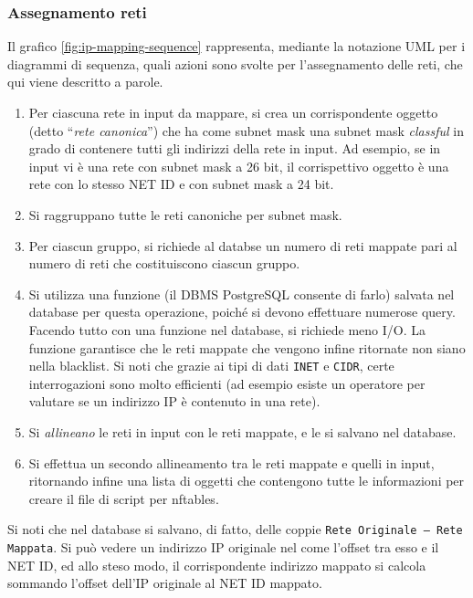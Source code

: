 \subsubsection{Assegnamento reti}
Il grafico \ref{fig:ip-mapping-sequence} rappresenta, mediante la notazione UML per
i diagrammi di sequenza, quali azioni sono svolte per l'assegnamento delle reti, che
qui viene descritto a parole.
\begin{enumerate}
	\item Per ciascuna rete in input da mappare, si crea un corrispondente oggetto (detto
	      ``\textit{rete canonica}'') che
	      ha come subnet mask una subnet mask \textit{classful} in grado di contenere tutti
	      gli indirizzi della rete in input. Ad esempio, se in input vi è una rete con subnet
	      mask a 26 bit, il corrispettivo oggetto è una rete con lo stesso NET ID e con
	      subnet mask a 24 bit.
	\item Si raggruppano tutte le reti canoniche per subnet mask.
	\item Per ciascun gruppo, si richiede al databse un numero di reti mappate pari
	      al numero di reti che costituiscono ciascun gruppo.
	\item Si utilizza una funzione
	      (il DBMS PostgreSQL consente di farlo) salvata nel database per questa operazione,
	      poiché si devono effettuare numerose query. Facendo tutto con una funzione nel database,
	      si richiede meno I/O. La funzione garantisce che le reti mappate che vengono
	      infine ritornate non siano nella blacklist. Si noti che grazie ai tipi di dati
	      \texttt{INET}  e \texttt{CIDR}, certe interrogazioni sono molto efficienti
	      (ad esempio esiste un operatore per valutare se un indirizzo IP è contenuto in una
	      rete).
	\item Si \textit{allineano} le reti in input con le reti mappate, e le si salvano
	      nel database.
	\item Si effettua un secondo allineamento tra le reti mappate e quelli in input,
	      ritornando infine una lista di oggetti che contengono tutte le informazioni
	      per creare il file di script per nftables.
\end{enumerate}
Si noti che nel database si salvano, di fatto, delle coppie \texttt{Rete Originale -- Rete Mappata}.
Si può vedere un indirizzo IP originale nel come l'offset tra esso e il NET ID, ed
allo steso modo, il corrispondente indirizzo mappato si calcola sommando l'offset dell'IP
originale al NET ID mappato.

